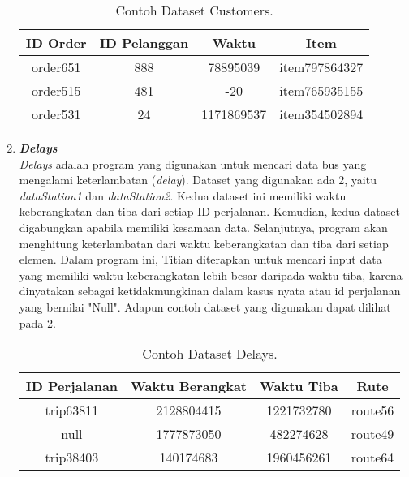 \begin{enumerate}
            \begin{longtable}{|c|c|c|c|}
                  \caption{Contoh Dataset Customers.}
                  \label{tb:customersdataset} \\
                  \hline
                  \rowcolor[HTML]{C0C0C0}
                  \textbf{ID Order} & \textbf{ID Pelanggan} & \textbf{Waktu} & \textbf{Item} \\
                  \hline
                  order651 & 888 & 78895039 & item797864327 \\
                  order515 & 481 & -20 & item765935155 \\
                  order531 & 24 & 1171869537 & item354502894 \\
                  \hline
            \end{longtable}
            
      \item \emph{\textbf{Delays}} \\
            \emph{Delays} adalah program yang digunakan untuk mencari data bus yang mengalami keterlambatan (\emph{delay}). Dataset yang digunakan ada 2, yaitu \emph{dataStation1} dan \emph{dataStation2}. Kedua dataset ini memiliki waktu keberangkatan dan tiba dari setiap ID perjalanan. Kemudian, kedua dataset digabungkan apabila memiliki kesamaan data. Selanjutnya, program akan menghitung keterlambatan dari waktu keberangkatan dan tiba dari setiap elemen. Dalam program ini, Titian diterapkan untuk mencari input data yang memiliki waktu keberangkatan lebih besar daripada waktu tiba, karena dinyatakan sebagai ketidakmungkinan dalam kasus nyata atau id perjalanan yang bernilai "Null".
            Adapun contoh dataset yang digunakan dapat 
            dilihat pada \ref{tb:delaysdataset}.

            \begin{longtable}{|c|c|c|c|}
                  \caption{Contoh Dataset Delays.}
                  \label{tb:delaysdataset} \\
                  \hline
                  \rowcolor[HTML]{C0C0C0}
                  \textbf{ID Perjalanan} & \textbf{Waktu Berangkat} & \textbf{Waktu Tiba} & \textbf{Rute} \\
                  \hline
                  trip63811 & 2128804415 & 1221732780 & route56 \\
                  null & 1777873050 & 482274628 & route49 \\
                  trip38403 & 140174683 & 1960456261 & route64 \\
                  \hline
            \end{longtable}


\end{enumerate}
